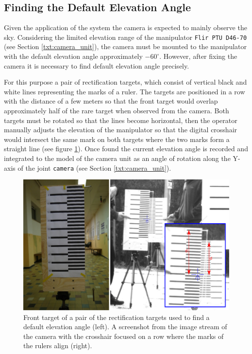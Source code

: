 \subsection{Finding the Default Elevation Angle}

Given the application of the system the camera is expected to mainly observe the sky. Considering the limited elevation range of the manipulator \texttt{Flir PTU D46-70} (see Section \ref{txt:camera_unit}), the camera must be mounted to the manipulator with the default elevation angle approximately $-60^{\circ}$. However, after fixing the camera it is necessary to find default elevation angle precisely. 

For this purpose a pair of rectification targets, which consist of vertical black and white lines representing the marks of a ruler. The targets are positioned in a row with the distance of a few meters so that the front target would overlap approximately half of the rare target when observed from the camera. Both targets must be rotated so that the lines become horizontal, then the operator manually adjusts the elevation of the manipulator so that the digital crosshair would intersect the same mark on both targets where the two marks form a straight line (see figure \ref{fig:rect_default_elevation_angle}). Once found the current elevation angle is recorded and integrated to the model of the camera unit as an angle of rotation along the Y-axis of the joint \texttt{camera} (see Section \ref{txt:camera_unit}).

\begin{figure}[htb]
	\centering
	\includegraphics[width=13cm]{fig/rect_default_elevation_angle.pdf}
	\caption{Front target of a pair of the rectification targets used to find a default elevation angle (left). A screenshot from the image stream of the camera with the crosshair focused on a row where the marks of the rulers align (right).}
	\label{fig:rect_default_elevation_angle}
\end{figure}

